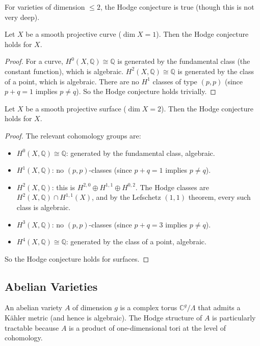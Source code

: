 For varieties of dimension $\le 2$, the Hodge conjecture is true (though this is not very deep).

\begin{proposition}
Let $X$ be a smooth projective curve ($\dim X = 1$). Then the Hodge conjecture holds for $X$.
\end{proposition}

\begin{proof}
For a curve, $H^0(X, \mathbb{Q}) \cong \mathbb{Q}$ is generated by the fundamental class (the constant function), which is algebraic. $H^2(X, \mathbb{Q}) \cong \mathbb{Q}$ is generated by the class of a point, which is algebraic. There are no $H^1$ classes of type $(p,p)$ (since $p + q = 1$ implies $p \neq q$). So the Hodge conjecture holds trivially.
\end{proof}

\begin{proposition}
Let $X$ be a smooth projective surface ($\dim X = 2$). Then the Hodge conjecture holds for $X$.
\end{proposition}

\begin{proof}
The relevant cohomology groups are:
\begin{itemize}
\item $H^0(X, \mathbb{Q}) \cong \mathbb{Q}$: generated by the fundamental class, algebraic.
\item $H^1(X, \mathbb{Q})$: no $(p,p)$-classes (since $p + q = 1$ implies $p \neq q$).
\item $H^2(X, \mathbb{Q})$: this is $H^{2,0} \oplus H^{1,1} \oplus H^{0,2}$. The Hodge classes are $H^2(X, \mathbb{Q}) \cap H^{1,1}(X)$, and by the Lefschetz $(1,1)$ theorem, every such class is algebraic.
\item $H^3(X, \mathbb{Q})$: no $(p,p)$-classes (since $p + q = 3$ implies $p \neq q$).
\item $H^4(X, \mathbb{Q}) \cong \mathbb{Q}$: generated by the class of a point, algebraic.
\end{itemize}
So the Hodge conjecture holds for surfaces.
\end{proof}

\subsection{Abelian Varieties}

An abelian variety $A$ of dimension $g$ is a complex torus $\mathbb{C}^g / \Lambda$ that admits a K\"{a}hler metric (and hence is algebraic). The Hodge structure of $A$ is particularly tractable because $A$ is a product of one-dimensional tori at the level of cohomology.

